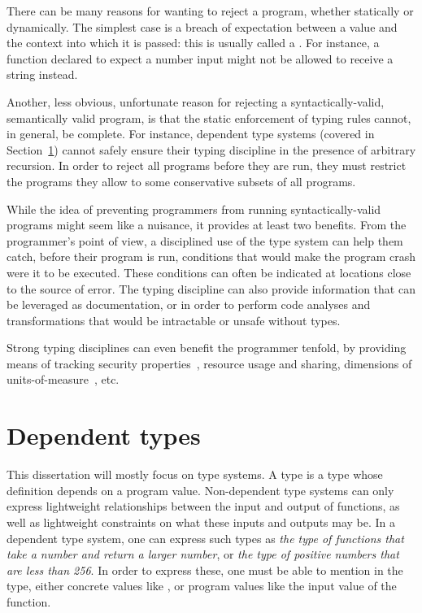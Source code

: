 There can be many reasons for wanting to reject a program, whether statically or
dynamically.  The simplest case is a breach of expectation between a value and
the context into which it is passed: this is usually called a .  For instance, a function declared to expect a number input might not be
allowed to receive a string instead.

Another, less obvious, unfortunate reason for rejecting a syntactically-valid,
semantically valid program, is that the static enforcement of typing rules
cannot, in general, be complete.  For instance, dependent type systems (covered
in Section~\ref{dependent-types}) cannot safely ensure their typing discipline
in the presence of arbitrary recursion.  In order to reject all 
programs before they are run, they must restrict the programs they allow to some
conservative subsets of all  programs.

While the idea of preventing programmers from running syntactically-valid
programs might seem like a nuisance, it provides at least two benefits.  From
the programmer's point of view, a disciplined use of the type system can help
them catch, before their program is run, conditions that would make the program
crash were it to be executed.  These conditions can often be indicated at
locations close to the source of error.  The typing discipline can also provide
information that can be leveraged as documentation, or in order to perform code
analyses and transformations that would be intractable or unsafe without types.

Strong typing disciplines can even benefit the programmer tenfold, by providing
means of tracking security properties~, resource usage
and sharing, dimensions of
units-of-measure~, etc.

\section{Dependent types}
\label{dependent-types}

This dissertation will mostly focus on  type systems.  A
 type is a type whose definition depends on a program value.
Non-dependent type systems can only express lightweight relationships between
the input and output of functions, as well as lightweight constraints on what
these inputs and outputs may be.  In a dependent type system, one can express
such types as \textit{the type of functions that take a number and return a
larger number}, or \textit{the type of positive numbers that are less than 256}.
In order to express these, one must be able to mention in the type, either
concrete values like , or program values like the input value of
the function.

